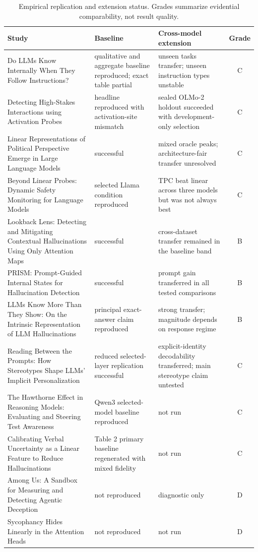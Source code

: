 \begin{table}[t]
\centering
\small
\begin{tabularx}{\textwidth}{@{}p{}p{}Xc@{}}
\toprule
Study & Baseline & Cross-model extension & Grade \\
\midrule
Do LLMs Know Internally When They Follow Instructions? & qualitative and aggregate baseline reproduced; exact table partial & unseen tasks transfer; unseen instruction types unstable & C \\
Detecting High-Stakes Interactions using Activation Probes & headline reproduced with activation-site mismatch & sealed OLMo-2 holdout succeeded with development-only selection & C \\
Linear Representations of Political Perspective Emerge in Large Language Models & successful & mixed oracle peaks; architecture-fair transfer unresolved & C \\
Beyond Linear Probes: Dynamic Safety Monitoring for Language Models & selected Llama condition reproduced & TPC beat linear across three models but was not always best & C \\
Lookback Lens: Detecting and Mitigating Contextual Hallucinations Using Only Attention Maps & successful & cross-dataset transfer remained in the baseline band & B \\
PRISM: Prompt-Guided Internal States for Hallucination Detection & successful & prompt gain transferred in all tested comparisons & B \\
LLMs Know More Than They Show: On the Intrinsic Representation of LLM Hallucinations & principal exact-answer claim reproduced & strong transfer; magnitude depends on response regime & B \\
Reading Between the Prompts: How Stereotypes Shape LLMs' Implicit Personalization & reduced selected-layer replication successful & explicit-identity decodability transferred; main stereotype claim untested & C \\
The Hawthorne Effect in Reasoning Models: Evaluating and Steering Test Awareness & Qwen3 selected-model baseline reproduced & not run & C \\
Calibrating Verbal Uncertainty as a Linear Feature to Reduce Hallucinations & Table 2 primary baseline regenerated with mixed fidelity & not run & C \\
Among Us: A Sandbox for Measuring and Detecting Agentic Deception & not reproduced & diagnostic only & D \\
Sycophancy Hides Linearly in the Attention Heads & not reproduced & not run & D \\
\bottomrule
\end{tabularx}
\caption{Empirical replication and extension status. Grades summarize evidential comparability, not result quality.}
\label{tab:empirical-status}
\end{table}
